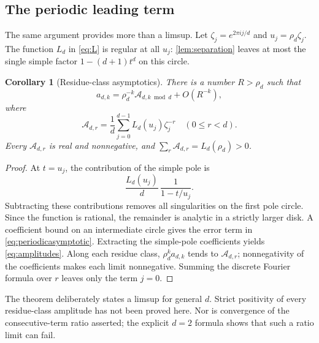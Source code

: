 \documentclass[11pt,letterpaper]{article}
\numberwithin{equation}{section}
\newtheorem{corollary}[theorem]{Corollary}
\theoremstyle{definition}
\theoremstyle{remark}
\begin{document}
\subsection{The periodic leading term}
The same argument provides more than a limsup. Let
$\zeta_j=e^{2\pi i j/d}$ and $u_j=\rho_d\zeta_j$.
The function $L_d$ in \eqref{eq:L} is regular at all $u_j$:
\cref{lem:separation} leaves at most the single simple factor
$1-(d+1)t^d$ on this circle.

\begin{corollary}[Residue-class asymptotics]\label{cor:periodic}
There is a number $R>\rho_d$ such that
\begin{equation}\label{eq:periodicasymptotic}
 a_{d,k}=\rho_d^{-k}\mathcal A_{d,k\bmod d}+O(R^{-k}),
\end{equation}
where
\begin{equation}\label{eq:amplitudes}
 \mathcal A_{d,r}=\frac1d\sum_{j=0}^{d-1}L_d(u_j)\zeta_j^{-r}
 \quad(0\le r<d).
\end{equation}
Every $\mathcal A_{d,r}$ is real and nonnegative, and
$\sum_r\mathcal A_{d,r}=L_d(\rho_d)>0$.
\end{corollary}
\begin{proof}
At $t=u_j$, the contribution of the simple pole is
\[
 \frac{L_d(u_j)}{d}\,\frac{1}{1-t/u_j}.
\]
Subtracting these contributions removes all singularities on the first
pole circle. Since the function is rational, the remainder is analytic
in a strictly larger disk. A coefficient bound on an intermediate
circle gives the error term in \eqref{eq:periodicasymptotic}.
Extracting the simple-pole coefficients yields
\eqref{eq:amplitudes}. Along each residue class,
$\rho_d^k a_{d,k}$ tends to $\mathcal A_{d,r}$; nonnegativity of the
coefficients makes each limit nonnegative. Summing the discrete Fourier
formula over $r$ leaves only the term $j=0$.
\end{proof}

The theorem deliberately states a limsup for general $d$. Strict
positivity of every residue-class amplitude has not been proved here.
Nor is convergence of the consecutive-term ratio asserted; the explicit
$d=2$ formula shows that such a ratio limit can fail.
\end{document}
